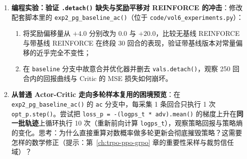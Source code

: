 \begin{enumerate}
  \item[\textbf{6.2.7}] \textbf{编程实验：验证 \texttt{.detach()} 缺失与奖励平移对 REINFORCE 的冲击}：修改配套脚本里的 \texttt{exp2\_pg\_\allowbreak baseline\_ac()}（位于 \texttt{code/\allowbreak vol6\_\allowbreak experiments.py}）：
  \begin{enumerate}
    \item 将奖励偏移量从 $+4.0$ 分别改为 $0.0$ 与 $+20.0$，比较无基线 REINFORCE 与带基线 REINFORCE 在终段 30 回合的表现，验证带基线版本对常量偏移的近乎完全不变性；
    \item 在 \texttt{baseline} 分支中故意合并优化器并删去 \texttt{vals.detach()}，观察 250 回合内的回报曲线与 Critic 的 MSE 损失如何崩坏。
  \end{enumerate}

  \item[\textbf{6.2.8}] \textbf{从普通 Actor-Critic 走向多轮样本复用的困境预览}：在 \texttt{exp2\_pg\_baseline\_ac()} 的 \texttt{ac} 分支中，每采集 1 条回合只执行 1 次 \texttt{opt\_p.step()}。尝试把 \texttt{loss\_p = -(logps\_t * adv).mean()} 的梯度上升在\textbf{同一批轨迹}上循环执行 10 次（重新前向计算 \texttt{logps\_t}），观察策略回报与策略熵的变化。思考：为什么直接重算对数概率做多轮更新会彻底摧毁策略？这需要怎样的数学修正（提示：第~\ref{ch:trpo-ppo-grpo} 章的重要性采样与裁剪信任域）？
\end{enumerate}
